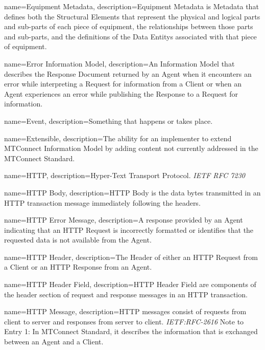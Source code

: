 {
    name={Equipment Metadata},
	description={\gls{Equipment Metadata} is {{Metadata}} that defines both the \glspl{Structural Element} that represent the physical and logical parts and sub-parts of each piece of equipment, the relationships between those parts and sub-parts, and the definitions of the \glspl{Data Entity} associated with that piece of equipment.}
}

{
    name={Error Information Model},
	description={An \gls{Information Model} that describes the \gls{Response Document} returned by an \gls{Agent} when it encounters an error while interpreting a \gls{Request} for information from a \gls{Client} or when an \gls{Agent} experiences an error while publishing the \gls{Response} to a \gls{Request} for information.}
}

{
    name={Event},
	description={Something that happens or takes place.}
}

{
    name={Extensible},
	description={The ability for an implementer to extend \gls{MTConnect Information Model} by adding content not currently addressed in the MTConnect Standard.
}
}

{
    name={HTTP},
	description={Hyper-Text Transport Protocol. \textit{IETF RFC 7230}
}
}

{
    name={HTTP Body},
	description={\gls{HTTP Body} is the data bytes transmitted in an HTTP transaction message immediately following the headers.}
}

{
    name={HTTP Error Message},
	description={A response provided by an \gls{Agent} indicating that an \gls{HTTP Request} is incorrectly formatted or identifies that the requested data is not available from the \gls{Agent}. }
}

{
    name={HTTP Header},
	description={The \gls{Header} of either an \gls{HTTP Request} from a \gls{Client} or an \gls{HTTP Response} from an \gls{Agent}.}
}

{
    name={HTTP Header Field},
	description={\gls{HTTP Header Field} are components of the header section of request and response messages in an HTTP transaction.}
}

{
    name={HTTP Message},
	description={HTTP messages consist of requests from client to server and responses from server to client. \textit{IETF:RFC-2616}
Note to Entry 1: In MTConnect Standard, it describes the information that is exchanged between an \gls{Agent} and a \gls{Client}.}
}

